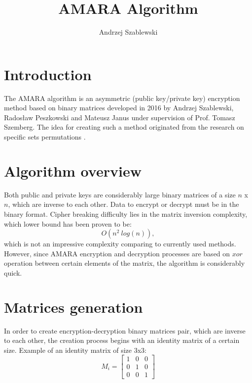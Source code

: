 \documentclass{article}
\author{Andrzej Szablewski}
\title{AMARA Algorithm}
\begin{document}
\maketitle

\section{Introduction}
    The AMARA algorithm is an asymmetric (public key/private key) encryption method based on binary matrices  developed in 2016 by Andrzej Szablewski, Radosław Peszkowski and Mateusz Janus under supervision of Prof. Tomasz Szemberg. The idea for creating such a method originated from the research on specific sets permutations \cite{research}.

\section{Algorithm overview}
    Both public and private keys are considerably large binary matrices of a size $n$ x $n$, which are inverse to each other. Data to encrypt or decrypt must be in the binary format. Cipher breaking difficulty lies in the matrix inversion complexity, which lower bound has been proven \cite{matrix_proof} to be: $$O(n^2\ log(n)),$$ which is not an impressive complexity comparing to currently used methods. However, since AMARA encryption and decryption processes are based on $xor$ operation between certain elements of the matrix, the algorithm is considerably quick.

\section{Matrices generation}
    In order to create encryption-decryption binary matrices pair, which are inverse to each other, the creation process begins with an identity matrix of a certain size. Example of an identity matrix of size 3x3:
    $$M_i=\begin{bmatrix}
    1 & 0 & 0\\
    0 & 1 & 0\\
    0 & 0 & 1
    \end{bmatrix}$$
\end{document}
